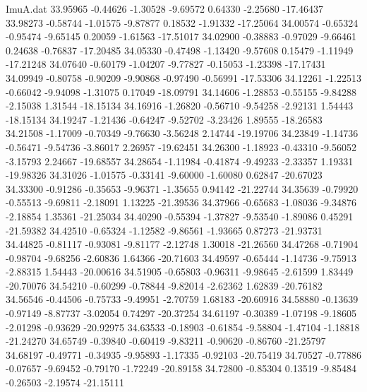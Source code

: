 \begin{filecontents}{ImuA.dat}
  33.95965   -0.44626   -1.30528   -9.69572    0.64330   -2.25680  -17.46437
  33.98273   -0.58744   -1.01575   -9.87877    0.18532   -1.91332  -17.25064
  34.00574   -0.65324   -0.95474   -9.65145    0.20059   -1.61563  -17.51017
  34.02900   -0.38883   -0.97029   -9.66461    0.24638   -0.76837  -17.20485
  34.05330   -0.47498   -1.13420   -9.57608    0.15479   -1.11949  -17.21248
  34.07640   -0.60179   -1.04207   -9.77827   -0.15053   -1.23398  -17.17431
  34.09949   -0.80758   -0.90209   -9.90868   -0.97490   -0.56991  -17.53306
  34.12261   -1.22513   -0.66042   -9.94098   -1.31075    0.17049  -18.09791
  34.14606   -1.28853   -0.55155   -9.84288   -2.15038    1.31544  -18.15134
  34.16916   -1.26820   -0.56710   -9.54258   -2.92131    1.54443  -18.15134
  34.19247   -1.21436   -0.64247   -9.52702   -3.23426    1.89555  -18.26583
  34.21508   -1.17009   -0.70349   -9.76630   -3.56248    2.14744  -19.19706
  34.23849   -1.14736   -0.56471   -9.54736   -3.86017    2.26957  -19.62451
  34.26300   -1.18923   -0.43310   -9.56052   -3.15793    2.24667  -19.68557
  34.28654   -1.11984   -0.41874   -9.49233   -2.33357    1.19331  -19.98326
  34.31026   -1.01575   -0.33141   -9.60000   -1.60080    0.62847  -20.67023
  34.33300   -0.91286   -0.35653   -9.96371   -1.35655    0.94142  -21.22744
  34.35639   -0.79920   -0.55513   -9.69811   -2.18091    1.13225  -21.39536
  34.37966   -0.65683   -1.08036   -9.34876   -2.18854    1.35361  -21.25034
  34.40290   -0.55394   -1.37827   -9.53540   -1.89086    0.45291  -21.59382
  34.42510   -0.65324   -1.12582   -9.86561   -1.93665    0.87273  -21.93731
  34.44825   -0.81117   -0.93081   -9.81177   -2.12748    1.30018  -21.26560
  34.47268   -0.71904   -0.98704   -9.68256   -2.60836    1.64366  -20.71603
  34.49597   -0.65444   -1.14736   -9.75913   -2.88315    1.54443  -20.00616
  34.51905   -0.65803   -0.96311   -9.98645   -2.61599    1.83449  -20.70076
  34.54210   -0.60299   -0.78844   -9.82014   -2.62362    1.62839  -20.76182
  34.56546   -0.44506   -0.75733   -9.49951   -2.70759    1.68183  -20.60916
  34.58880   -0.13639   -0.97149   -8.87737   -3.02054    0.74297  -20.37254
  34.61197   -0.30389   -1.07198   -9.18605   -2.01298   -0.93629  -20.92975
  34.63533   -0.18903   -0.61854   -9.58804   -1.47104   -1.18818  -21.24270
  34.65749   -0.39840   -0.60419   -9.83211   -0.90620   -0.86760  -21.25797
  34.68197   -0.49771   -0.34935   -9.95893   -1.17335   -0.92103  -20.75419
  34.70527   -0.77886   -0.07657   -9.69452   -0.79170   -1.72249  -20.89158
  34.72800   -0.85304    0.13519   -9.85484   -0.26503   -2.19574  -21.15111

\end{filecontents}
